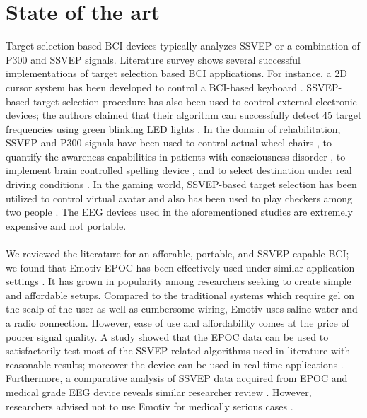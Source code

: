 \documentclass{svmult}
\begin{document}
\section{State of the art}
\label{sec:soa}
Target selection based BCI devices typically analyzes SSVEP or a combination of P300 and SSVEP signals. Literature survey shows several successful implementations of target selection based BCI applications. For instance, a 2D cursor system has been developed to control a BCI-based keyboard \cite{yin2015hybrid}. SSVEP-based target selection procedure has also been used to control external electronic devices; the authors claimed that their algorithm can successfully detect 45 target frequencies using green blinking LED lights \cite{SSVEPfiability}. In the domain of rehabilitation, SSVEP and P300 signals have been used to control actual wheel-chairs \cite{paper4}, to quantify the awareness capabilities in patients with consciousness disorder \cite{paper8}, to implement brain controlled spelling device \cite{paper2}, and to select destination under real driving conditions \cite{car}. In the gaming world, SSVEP-based target selection has been utilized to control virtual avatar \cite{paper_5} and also has been used to play checkers among two people \cite{paper6}. The EEG devices used in the aforementioned studies are extremely expensive and not portable.\\
\\
We reviewed the literature for an afforable, portable, and SSVEP capable BCI; we found that Emotiv EPOC has been effectively used under similar application settings \cite{jian2014improving, van2012designing}. It has grown in popularity among researchers seeking to create simple and affordable setups. 
Compared to the traditional systems which require gel on the scalp of the user as well as cumbersome wiring, Emotiv uses saline water and a radio connection. However, ease of use and affordability comes at the price of poorer signal quality. 
A study showed that the EPOC data can be used to satisfactorily test most of the SSVEP-related algorithms used in literature with reasonable results; moreover the device can be used in real-time applications \cite{hvaring2014comparison}. Furthermore, a comparative analysis of SSVEP data acquired from EPOC and medical grade EEG device reveals similar researcher review \cite{liu2012implementation}. However, researchers advised not to use Emotiv for medically serious cases \cite{duvinage2013performance}.\\
\\
\end{document}
